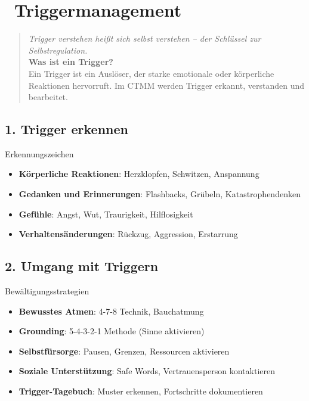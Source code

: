 
\newpage
\section*{\textcolor{ctmmOrange}{\faExclamationCircle~Triggermanagement}}

\begin{quote}
\textit{\textcolor{ctmmOrange}{Trigger verstehen heißt sich selbst verstehen -- der Schlüssel zur Selbstregulation.}}\\
\textbf{\textcolor{ctmmOrange}{Was ist ein Trigger?}}\\
Ein Trigger ist ein Auslöser, der starke emotionale oder körperliche Reaktionen hervorruft. Im CTMM werden Trigger erkannt, verstanden und bearbeitet.
\end{quote}

\subsection*{\textcolor{ctmmOrange}{1. Trigger erkennen}}

\begin{ctmmOrangeBox}{Erkennungszeichen}
\begin{itemize}
  \item \textbf{Körperliche Reaktionen}: Herzklopfen, Schwitzen, Anspannung
  \item \textbf{Gedanken und Erinnerungen}: Flashbacks, Grübeln, Katastrophendenken  
  \item \textbf{Gefühle}: Angst, Wut, Traurigkeit, Hilflosigkeit
  \item \textbf{Verhaltensänderungen}: Rückzug, Aggression, Erstarrung
\end{itemize}
\end{ctmmOrangeBox}

\subsection*{\textcolor{ctmmOrange}{2. Umgang mit Triggern}}

\begin{ctmmGreenBox}{Bewältigungsstrategien}
\begin{itemize}
  \item \textbf{Bewusstes Atmen}: 4-7-8 Technik, Bauchatmung
  \item \textbf{Grounding}: 5-4-3-2-1 Methode (Sinne aktivieren)
  \item \textbf{Selbstfürsorge}: Pausen, Grenzen, Ressourcen aktivieren
  \item \textbf{Soziale Unterstützung}: Safe Words, Vertrauensperson kontaktieren
  \item \textbf{Trigger-Tagebuch}: Muster erkennen, Fortschritte dokumentieren
\end{itemize}
\end{ctmmGreenBox}

